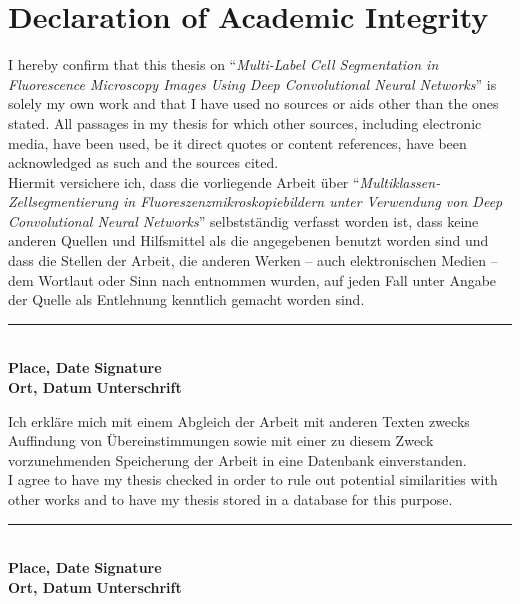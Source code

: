\chapter* {Declaration of Academic Integrity}

I hereby confirm that this thesis on ``\textit{Multi-Label Cell Segmentation in Fluorescence Microscopy Images Using Deep Convolutional Neural Networks}'' is solely my own work and that I have used no sources or aids other than the ones stated. All passages in my thesis for which other sources, including electronic media, have been used, be it direct quotes or content references, have been acknowledged as such and the sources cited.\\

\noindent Hiermit versichere ich, dass die vorliegende Arbeit über ``\textit{Multiklassen-Zellsegmentierung in Fluoreszenzmikroskopiebildern unter Verwendung von Deep Convolutional Neural Networks}'' selbstständig verfasst worden ist, dass keine anderen Quellen und Hilfsmittel als die angegebenen benutzt worden sind und dass die Stellen der Arbeit, die anderen Werken – auch elektronischen Medien – dem Wortlaut oder Sinn nach entnommen wurden, auf jeden Fall unter Angabe der Quelle als Entlehnung kenntlich gemacht worden sind.\\[1.0cm]


\begin {flushleft}
	\rule{15cm}{0.4pt}\\
	\textbf{Place, Date} \hspace{4.1cm}\textbf{Signature}\\
	\noindent \textbf{Ort, Datum} \hspace{4cm}\textbf{Unterschrift}\\
\end {flushleft}
\vspace{1.0cm}

\noindent Ich erkläre mich mit einem Abgleich der Arbeit mit anderen Texten zwecks Auffindung von Übereinstimmungen sowie mit einer zu diesem Zweck vorzunehmenden Speicherung der Arbeit in eine Datenbank einverstanden.\\

\noindent I agree to have my thesis checked in order to rule out potential similarities with other works and to have my thesis stored in a database for this purpose.\\[1.0cm]


\begin {flushleft}
	\rule{15cm}{0.4pt}\\
	\textbf{Place, Date} \hspace{4.1cm}\textbf{Signature}\\
	\noindent \textbf{Ort, Datum} \hspace{4cm}\textbf{Unterschrift}\\
\end {flushleft}